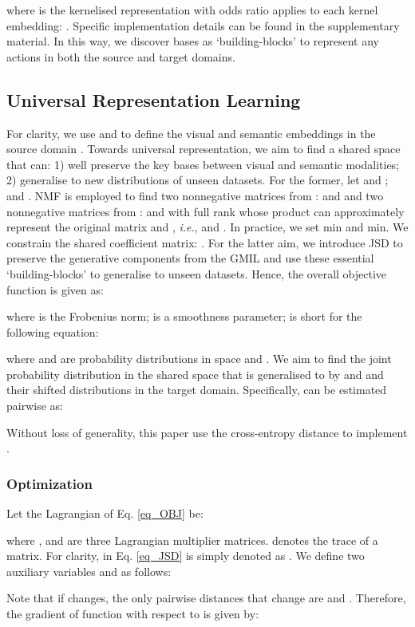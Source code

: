 \documentclass[10pt,twocolumn,letterpaper]{article}
\begin{document}
where  is the kernelised representation with odds ratio \cite{local_nbnn} applies to each kernel embedding: . Specific implementation details can be found in the supplementary material. In this way, we discover  bases as `building-blocks' to represent any actions in both the source and target domains.

\vspace{-1ex}
\subsection{Universal Representation Learning}
For clarity, we use  and  to define the visual and semantic embeddings in the source domain . Towards universal representation, we aim to find a shared space that can: 1) well preserve the key bases between visual and semantic modalities; 2) generalise to new distributions of unseen datasets. 
For the former, let  and ;  and . NMF is employed to find two nonnegative matrices from :  and  and two nonnegative matrices from :  and  with full rank whose product can approximately represent the original matrix  and , \emph{i.e.},  and . In practice, we set  min and  min. 
We constrain the shared coefficient matrix: . 
For the latter aim, we introduce JSD to preserve the generative components from the GMIL and use these essential `building-blocks' to generalise to unseen datasets. Hence, the overall objective function is given as:

where  is the Frobenius norm;  is a smoothness parameter;  is short for the following equation:

where  and  are probability distributions in space  and . We aim to find the joint probability distribution  in the shared space  that is generalised to by  and  and their shifted distributions in the target domain. Specifically,  can be estimated pairwise as:


Without loss of generality, this paper use the cross-entropy distance to implement .
\vspace{-1ex}
\subsubsection{Optimization}
Let the Lagrangian of Eq. \ref{eq_OBJ} be:

where ,  and  are three Lagrangian multiplier matrices.  denotes the trace of a matrix. For clarity,  in Eq. \ref{eq_JSD} is simply denoted as . We define two auxiliary variables  and  as follows:


Note that if  changes, the only pairwise distances that change are  and . Therefore, the gradient of function  with respect to  is given by:
\end{document}
